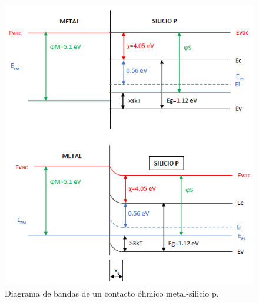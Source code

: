 \begin{figure}[H]
    \centering
    \includegraphics{figuras/contacto_resumen_4.png}
    \caption{Diagrama de bandas de un contacto óhmico metal-silicio p.}
    \label{contacto_resumen_4}
\end{figure}















